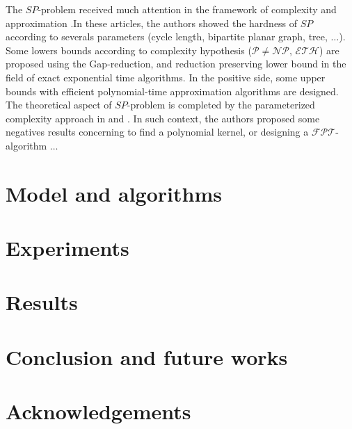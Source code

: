 \documentclass[]{llncs}
\begin{document}
 The $SP$-problem received much attention in the framework of complexity and approximation \cite{ChateauG15}.In these articles, the authors showed the hardness of $SP$ according to  severals parameters (cycle length, bipartite planar graph, tree,  $\ldots$). Some lowers bounds according to complexity hypothesis ($\mathcal{P} \neq \mathcal{NP}$, $\mathcal{ETH}$)  are proposed using the Gap-reduction, and reduction preserving lower bound in the field of exact exponential time algorithms. In the positive side, some upper bounds with efficient polynomial-time approximation algorithms are designed.  The theoretical aspect of $SP$-problem is completed by the  parameterized  complexity approach in \cite{conf-WCG15} and \cite{algorithmica}. In such context, the authors proposed some negatives results concerning to find a polynomial kernel,  or designing a $\mathcal{FPT}$-algorithm $\ldots$


 

\section{Model and algorithms}\label{sec:pb}



\section{Experiments}\label{sec:experiments}



\section{Results}\label{sec:results}

\section{Conclusion and future works}\label{sec:conclusion}


\section*{Acknowledgements}
\label{sec:acknowledgements}




\end{document}
